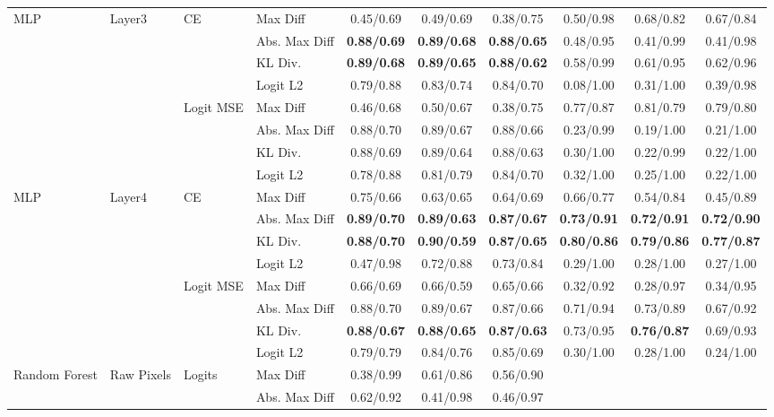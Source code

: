 \documentclass[border=2pt]{standalone}
\begin{document}
\begin{tabular}{llllcccccc}
\midrule
MLP & Layer3 & CE & Max Diff & 0.45/0.69 & 0.49/0.69 & 0.38/0.75 & 0.50/0.98 & 0.68/0.82 & 0.67/0.84 \\
 &  &  & Abs. Max Diff & \textbf{0.88/0.69} & \textbf{0.89/0.68} & \textbf{0.88/0.65} & 0.48/0.95 & 0.41/0.99 & 0.41/0.98 \\
 &  &  & KL Div. & \textbf{0.89/0.68} & \textbf{0.89/0.65} & \textbf{0.88/0.62} & 0.58/0.99 & 0.61/0.95 & 0.62/0.96 \\
 &  &  & Logit L2 & 0.79/0.88 & 0.83/0.74 & 0.84/0.70 & 0.08/1.00 & 0.31/1.00 & 0.39/0.98 \\
\addlinespace
 &  & Logit MSE & Max Diff & 0.46/0.68 & 0.50/0.67 & 0.38/0.75 & 0.77/0.87 & 0.81/0.79 & 0.79/0.80 \\
 &  &  & Abs. Max Diff & 0.88/0.70 & 0.89/0.67 & 0.88/0.66 & 0.23/0.99 & 0.19/1.00 & 0.21/1.00 \\
 &  &  & KL Div. & 0.88/0.69 & 0.89/0.64 & 0.88/0.63 & 0.30/1.00 & 0.22/0.99 & 0.22/1.00 \\
 &  &  & Logit L2 & 0.78/0.88 & 0.81/0.79 & 0.84/0.70 & 0.32/1.00 & 0.25/1.00 & 0.22/1.00 \\
\midrule
MLP & Layer4 & CE & Max Diff & 0.75/0.66 & 0.63/0.65 & 0.64/0.69 & 0.66/0.77 & 0.54/0.84 & 0.45/0.89 \\
 &  &  & Abs. Max Diff & \textbf{0.89/0.70} & \textbf{0.89/0.63} & \textbf{0.87/0.67} & \textbf{0.73/0.91} & \textbf{0.72/0.91} & \textbf{0.72/0.90} \\
 &  &  & KL Div. & \textbf{0.88/0.70} & \textbf{0.90/0.59} & \textbf{0.87/0.65} & \textbf{0.80/0.86} & \textbf{0.79/0.86} & \textbf{0.77/0.87} \\
 &  &  & Logit L2 & 0.47/0.98 & 0.72/0.88 & 0.73/0.84 & 0.29/1.00 & 0.28/1.00 & 0.27/1.00 \\
\addlinespace
 &  & Logit MSE & Max Diff & 0.66/0.69 & 0.66/0.59 & 0.65/0.66 & 0.32/0.92 & 0.28/0.97 & 0.34/0.95 \\
 &  &  & Abs. Max Diff & 0.88/0.70 & 0.89/0.67 & 0.87/0.66 & 0.71/0.94 & 0.73/0.89 & 0.67/0.92 \\
 &  &  & KL Div. & \textbf{0.88/0.67} & \textbf{0.88/0.65} & \textbf{0.87/0.63} & 0.73/0.95 & \textbf{0.76/0.87} & 0.69/0.93 \\
 &  &  & Logit L2 & 0.79/0.79 & 0.84/0.76 & 0.85/0.69 & 0.30/1.00 & 0.28/1.00 & 0.24/1.00 \\
\midrule
Random Forest & Raw Pixels & Logits & Max Diff & 0.38/0.99 & 0.61/0.86 & 0.56/0.90 &  &  &  \\
 &  &  & Abs. Max Diff & 0.62/0.92 & 0.41/0.98 & 0.46/0.97 &  &  &  \\

\end{tabular}
\end{document}
